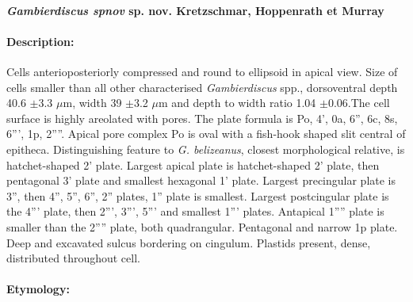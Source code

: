 \documentclass[12pt]{article}
\begin{document}

 \paragraph{\textbf{\emph{Gambierdiscus spnov} sp. nov. Kretzschmar, Hoppenrath et Murray}}
 \paragraph{Description:} Cells anterioposteriorly compressed and round to ellipsoid in apical view. Size of cells smaller than all other characterised \emph{Gambierdiscus} spp., dorsoventral depth 40.6 $\pm$3.3 $\mu$m, width 39 $\pm$3.2 $\mu$m and depth to width ratio 1.04 $\pm$0.06.The cell surface is highly areolated with pores. The plate formula is Po, 4', 0a, 6'', 6c, 8s, 6''', 1p, 2''''. 
Apical pore complex Po is oval with a fish-hook shaped slit central of epitheca. Distinguishing feature to \emph{G. belizeanus}, closest morphological relative, is hatchet-shaped 2' plate. Largest apical plate is hatchet-shaped 2' plate, then pentagonal 3' plate and smallest hexagonal 1' plate. Largest precingular plate is 3'', then 4'', 5'', 6'', 2'' plates, 1'' plate is smallest. Largest postcingular plate is the 4''' plate, then 2''', 3''', 5''' and smallest 1''' plates. Antapical 1'''' plate is smaller than the 2'''' plate, both quadrangular. Pentagonal and narrow 1p plate. Deep and excavated sulcus bordering on cingulum. Plastids present, dense, distributed throughout cell. 
 \paragraph{Etymology:} %
\end{document}
